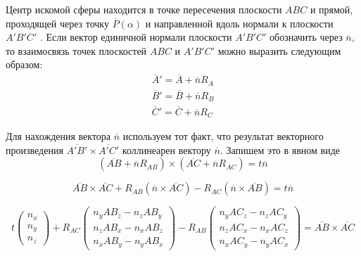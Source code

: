 Центр искомой сферы находится в точке пересечения плоскости $ABC$ и прямой, проходящей через точку $\overline{P}(\alpha)$ и направленной вдоль нормали к плоскости $A'B'C'$ .
Если вектор единичной нормали плоскости $A'B'C'$ обозначить через $\overline{n}$, то взаимосвязь точек плоскостей $ABC$ и $A'B'C'$ можно выразить следующим образом:
\begin{equation}
	\begin{aligned}
		\overline{A}' = \overline{A} + \overline{n}R_A \\
		\overline{B}' = \overline{B} + \overline{n}R_B \\
		\overline{C}' = \overline{C} + \overline{n}R_C
	\end{aligned}
\end{equation}

Для нахождения вектора $\overline{n}$ используем тот факт, что результат векторного произведения $\overline{A'B'} \times \overline{A'C'}$ коллинеарен вектору $\overline{n}$.
Запишем это в явном виде
\begin{equation}
	(\overline{AB} + \overline{n} R_{AB}) \times (\overline{AC} + \overline{n} R_{AC}) = t \overline{n}
\end{equation}

\begin{equation}
	\overline{AB} \times \overline{AC} + R_{AB}(\overline{n} \times \overline{AC}) - R_{AC}(\overline{n} \times \overline{AB}) = t \overline{n}
\end{equation}

\begin{equation}\label{eqn:text_1_remesh_common_envelope_matr}
	t
	\begin{pmatrix}
		n_x \\
		n_y \\
		n_z
	\end{pmatrix}
	+ R_{AC}
	\begin{pmatrix}
		n_y AB_z - n_z AB_y \\
		n_z AB_x - n_x AB_z \\
		n_x AB_y - n_y AB_x
	\end{pmatrix}
	- R_{AB}
	\begin{pmatrix}
		n_y AC_z - n_z AC_y \\
		n_z AC_x - n_x AC_z \\
		n_x AC_y - n_y AC_x
	\end{pmatrix}
	= \overline{AB} \times \overline{AC}
\end{equation}

